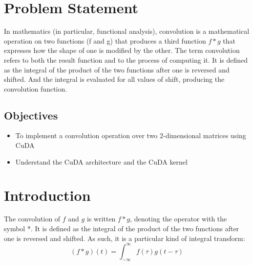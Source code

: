 \documentclass[12pt, letterpaper]{article}
\begin{document}


\tableofcontents
\newpage

\section{Problem Statement}

\hspace*{0.25 in}In mathematics (in particular, functional analysis), convolution is a mathematical operation on two functions (f and g) that produces a third function $f * g$ that expresses how the shape of one is modified by the other. The term convolution refers to both the result function and to the process of computing it. It is defined as the integral of the product of the two functions after one is reversed and shifted. And the integral is evaluated for all values of shift, producing the convolution function.

\subsection{Objectives}
\begin{itemize}
	\item To implement a convolution operation over two 2-dimensional matrices using CuDA
	\item Understand the CuDA architecture and the CuDA kernel
\end{itemize}

\section{Introduction}
	The convolution of $f$ and $g$ is written $f*g$, denoting the operator with the symbol *. It is defined as the integral of the product of the two functions after one is reversed and shifted. As such, it is a particular kind of integral transform:
	$$
		(f*g)(t) = \int_{-\infty}^{\infty} f(\tau ) g(t- \tau)
	$$
\end{document}
